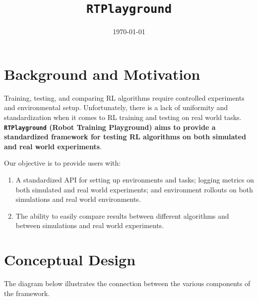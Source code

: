 \documentclass{article}
\begin{document}
\title{\texttt{RTPlayground}}
\date{\today}

\maketitle

\section{Background and Motivation}

Training, testing, and comparing RL algorithms require controlled experiments and environmental setup. Unfortunately, there is a lack of uniformity and standardization when it comes to RL training and testing on real world tasks. \textbf{\texttt{RTPlayground} (Robot Training Playground) aims to provide a standardized framework for testing RL algorithms on both simulated and real world experiments}.

Our objective is to provide users with:
\begin{enumerate}[nolistsep]
    \item A standardized API for setting up environments and tasks; logging metrics on both simulated and real world experiments; and environment rollouts on both simulations and real world environments.
    \item The ability to easily compare results between different algorithms and between simulations and real world experiments.
\end{enumerate}

\section{Conceptual Design}

The diagram below illustrates the connection between the various components of the framework.
\end{document}
